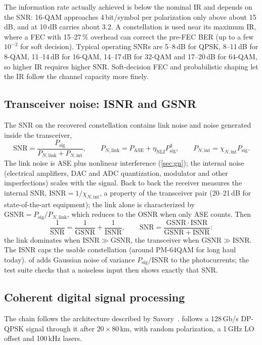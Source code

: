 The information rate actually achieved is below the nominal IR and depends on the SNR: 16-QAM
approaches 4\,bit/symbol per polarization only above about 15\,dB, and at 10\,dB carries about 3.2. A
constellation is used near its maximum IR, where a FEC with 15--27\,\% overhead can correct the
pre-FEC BER (up to a few $10^{-2}$ for soft decision). Typical operating SNRs are 5--8\,dB for QPSK,
8--11\,dB for 8-QAM, 11--14\,dB for 16-QAM, 14--17\,dB for 32-QAM and 17--20\,dB for 64-QAM, so higher IR
requires higher SNR. Soft-decision FEC and probabilistic shaping let the IR follow the channel
capacity more finely.

\subsection{Transceiver noise: ISNR and GSNR}
The SNR on the recovered constellation contains link noise and noise generated inside the
transceiver,
\begin{equation}
  \mathrm{SNR}=\frac{P_{\mathrm{sig}}}{P_{N,\mathrm{link}}+P_{N,\mathrm{int}}},\qquad
  P_{N,\mathrm{link}}=P_{\mathrm{ASE}}+\eta_{\mathrm{NLI}}P_{\mathrm{sig}}^3,\qquad P_{N,\mathrm{int}}=\chi_{N,\mathrm{int}}P_{\mathrm{sig}}.
\end{equation}
The link noise is ASE plus nonlinear interference (\cref{sec:gn}); the internal noise (electrical
amplifiers, DAC and ADC quantization, modulator and other imperfections) scales with the signal.
Back to back the receiver measures the internal SNR, $\mathrm{ISNR}=1/\chi_{N,\mathrm{int}}$, a property of the
transceiver pair (20--21\,dB for state-of-the-art equipment); the link alone is characterized by
$\mathrm{GSNR}=P_{\mathrm{sig}}/P_{N,\mathrm{link}}$, which reduces to the OSNR when only ASE counts. Then
\begin{equation}
  \frac1{\mathrm{SNR}}=\frac1{\mathrm{GSNR}}+\frac1{\mathrm{ISNR}},\qquad \mathrm{SNR}=\frac{\mathrm{GSNR}\cdot\mathrm{ISNR}}{\mathrm{GSNR}+\mathrm{ISNR}} :
\end{equation}
the link dominates when $\mathrm{ISNR}\gg\mathrm{GSNR}$, the transceiver when $\mathrm{GSNR}\gg\mathrm{ISNR}$. The ISNR caps the usable
constellation (around PM-64QAM for long haul today).  of 
adds Gaussian noise of variance $P_{\mathrm{sig}}/\mathrm{ISNR}$ to the photocurrents; the test suite checks that a
noiseless input then shows exactly that SNR.

\subsection{Coherent digital signal processing}\label{sec:coherent-dsp}
The chain follows the architecture described by Savory~\cite{savory2010}. 
follows a 128\,Gb/s DP-QPSK signal through it after $20\times80$\,km, with random polarization, a 1\,GHz LO
offset and 100\,kHz lasers.

